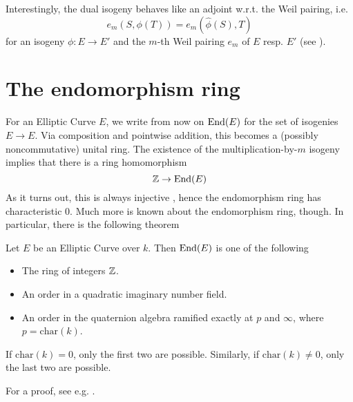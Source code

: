 Interestingly, the dual isogeny behaves like an adjoint w.r.t. the Weil pairing, i.e.
\begin{equation*}
    e_m(S, \phi(T)) = e_m(\hat{\phi}(S), T)
\end{equation*}
for an isogeny $\phi: E \to E'$ and the $m$-th Weil pairing $e_m$ of $E$ resp. $E'$ (see \cite[Prop.~III.8.2]{arithmetic_elliptic_curves}).

\section{The endomorphism ring}
For an Elliptic Curve $E$, we write from now on $\mathrm{End}(E)$ for the set of isogenies $E \to E$.
Via composition and pointwise addition, this becomes a (possibly noncommutative) unital ring.
The existence of the multiplication-by-$m$ isogeny implies that there is a ring homomorphism
\begin{equation*}
    \mathbb{Z} \to \mathrm{End}(E)
\end{equation*}
As it turns out, this is always injective \cite[Prop.~III.4.2]{arithmetic_elliptic_curves}, hence the endomorphism ring has characteristic 0.
Much more is known about the endomorphism ring, though.
In particular, there is the following theorem
\begin{theorem}
    Let $E$ be an Elliptic Curve over $k$. Then $\mathrm{End}(E)$ is one of the following
    \begin{itemize}
        \item The ring of integers $\mathbb{Z}$.
        \item An order in a quadratic imaginary number field.
        \item An order in the quaternion algebra ramified exactly at $p$ and $\infty$, where $p = \mathrm{char}(k)$.
    \end{itemize}
    If $\mathrm{char}(k) = 0$, only the first two are possible.
    Similarly, if $\mathrm{char}(k) \neq 0$, only the last two are possible. 
\end{theorem}
For a proof, see e.g. \cite[Corollary~III.9.4]{arithmetic_elliptic_curves}.

